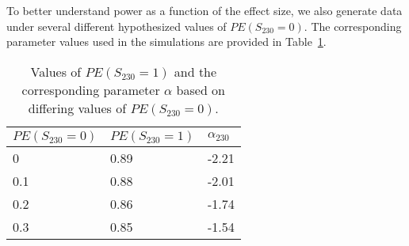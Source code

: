 \documentclass[10pt]{article}
\begin{document}
To better understand power as a function of the effect size, we also generate data under several different hypothesized values of $PE(S_{230} = 0)$. The corresponding parameter values used in the simulations are provided in Table~\ref{tab:effect_size}.

\begin{table}
  \centering
  \caption{Values of $PE(S_{230} = 1)$ and the corresponding parameter $\alpha$ based on differing values of $PE(S_{230} = 0)$.}
  \label{tab:effect_size}
  \begin{tabular}{lll}
    $PE(S_{230} = 0)$ & $PE(S_{230} = 1)$ & $\alpha_{230}$ \\
    \hline
    0 & 0.89 & -2.21 \\
    0.1 & 0.88 & -2.01 \\
    0.2 & 0.86 & -1.74\\
    0.3 & 0.85 & -1.54
  \end{tabular}
\end{table}
\end{document}
